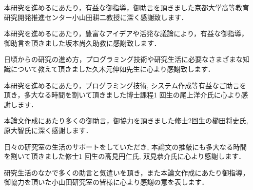 \documentclass[sotsuron]{kuee}
\begin{document}
\begin{acknowledgements}
本研究を進めるにあたり，有益な御指導，御助言を頂きました京都大学高等教育研究開発推進センター小山田耕二教授に深く感謝致します．

本研究を進めるにあたり，豊富なアイデアや活発な議論により，有益な御指導，御助言を頂きました坂本尚久助教に感謝致します．

日頃からの研究の進め方，プログラミング技術や研究生活に必要なさまざまな知識について教えて頂きました久木元伸如先生に心より感謝致します．

本研究を進めるにあたり，プログラミング技術, システム作成等有益なご助言を頂き，多大なる時間を割いて頂きました博士課程1 回生の尾上洋介氏に心より感謝します．

本論文作成にあたり多くの御助言，御協力を頂きました修士2回生の櫛田将史氏, 原大智氏に深く感謝します．

日々の研究室の生活のサポートをしていただき, 本論文の推敲にも多大なる時間を割いて頂きました修士1 回生の高見円仁氏, 双見恭介氏に心より感謝します．

研究生活のなかで多くの助言と気遣いを頂き，また本論文作成にあたり御指導，御協力を頂いた小山田研究室の皆様に心より感謝の意を表します．

\end{acknowledgements}



\end{document}

